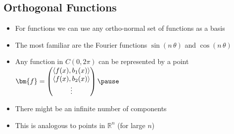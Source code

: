\begin{slide}
\section[-1]{Orthogonal Functions}

\begin{PauseHighLight}
  \begin{minipage}{0.75\linewidth}
    \begin{itemize}
    \item For functions we can use any ortho-normal set of functions as
      a basis\pause
    \item The most familiar are the Fourier functions $\sin(n\,\theta)$
      and $\cos(n\,\theta)$\pause
    \item Any function in $C(0,2\pi)$ can be represented by a point
      $\bm{f} = \begin{pmatrix}
      \langle f(x), b_1(x) \rangle \\ 
      \langle f(x), b_2(x) \rangle \\ 
      \vdots
    \end{pmatrix}\pause$
  \item There might be an infinite number of components\pause
  \item This is analogous to points in $\mathbb{R}^n$ (for large $n$)\pause
    \end{itemize}
  \end{minipage}
  \begin{minipage}{0.23\linewidth}
    \begin{center}

\end{center}
\end{minipage}
\end{PauseHighLight}
\end{slide}

